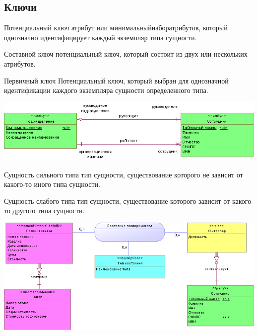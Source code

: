 \documentclass{beamer}
\begin{document}
\subsection{Ключи}
\begin{frame}
\begin{block}{Потенциальный ключ}
атрибут или минимальныйнаборатрибутов, который однозначно идентифицирует каждый экземпляр типа сущности.
\end{block}
\begin{block}{Составной ключ}
потенциальный ключ, который состоит из двух или нескольких атрибутов.
\end{block}
\begin{block}{Первичный ключ}
Потенциальный ключ, который выбран для однозначной идентификации каждого экземпляра сущности определенного типа.
\end{block}
\begin{center}
\includegraphics[scale=0.5]{images/keys.png}
\end{center}
\end{frame}

\begin{frame}
\begin{block}{Сущность сильного типа}
тип сущности, существование которого не зависит от какого-то иного типа сущности.
\end{block}
\begin{block}{Сущность слабого типа}
тип сущности, существование которого зависит от какого-то другого типа сущности.
\end{block}
\begin{center}
\includegraphics[scale=0.5]{images/depend.png}
\end{center}
\end{frame}
\end{document}
